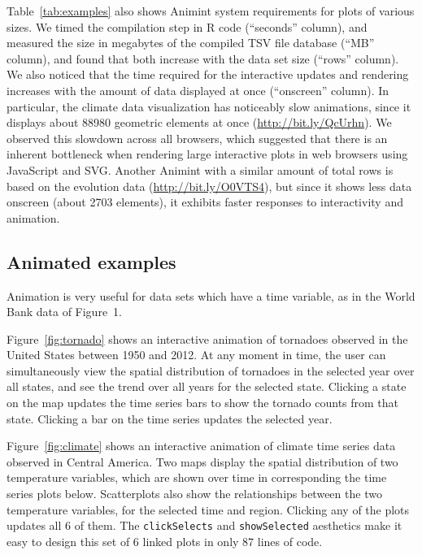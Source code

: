 \documentclass[10pt,journal,compsoc]{IEEEtran}\usepackage[]{graphicx}\usepackage[]{color}
\begin{document}
Table~\ref{tab:examples} also shows Animint system requirements for
plots of various sizes. We timed the compilation step in R code
(``seconds'' column), and measured the size in megabytes of the
compiled TSV file database (``MB'' column), and found that both
increase with the data set size (``rows'' column).
We also noticed that the time required for the interactive updates and
rendering increases with the amount of data displayed at once
(``onscreen'' column). In particular, the climate data visualization
has noticeably slow animations, since it displays about 88980
geometric elements at once (\url{http://bit.ly/QcUrhn}). We observed
this slowdown across all browsers, which suggested that there is an
inherent bottleneck when rendering large interactive plots in web
browsers using JavaScript and SVG. Another Animint with a similar
amount of total rows is based on the evolution data
(\url{http://bit.ly/O0VTS4}), but since it shows less data onscreen
(about 2703 elements), it exhibits faster responses to interactivity
and animation.

\subsection{Animated examples}

Animation is very useful for data sets which have a time variable,
as in the World Bank data of Figure~1.

Figure~\ref{fig:tornado} shows an interactive animation of tornadoes
observed in the United States between 1950 and 2012. At any moment in
time, the user can simultaneously view the spatial distribution of
tornadoes in the selected year over all states, and see the trend over
all years for the selected state. Clicking a state on the map updates the
time series bars to show the tornado counts from that state. Clicking
a bar on the time series updates the selected year.

Figure~\ref{fig:climate} shows an interactive animation of climate
time series data observed in Central America. Two maps display the
spatial distribution of two temperature variables, which are shown
over time in corresponding the time series plots below. Scatterplots
also show the relationships between the two temperature variables, for
the selected time and region. Clicking any of the plots updates all 6
of them. The \texttt{clickSelects} and \texttt{showSelected} aesthetics make it easy to
design this set of 6 linked plots in only 87 lines of code.
\end{document}
